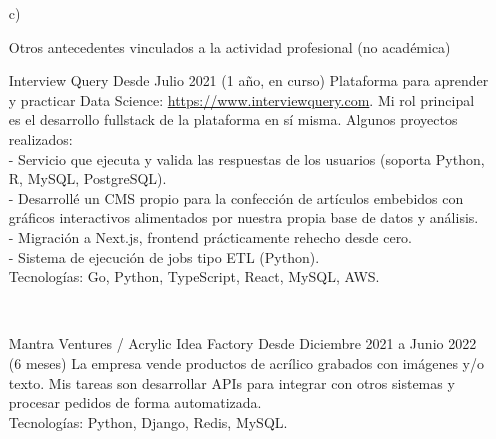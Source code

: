 \begin{enumerate}[leftmargin=0.8cm]

  \item[c)]{Otros antecedentes vinculados a la actividad profesional (no académica)

    \begin{itemize}[leftmargin=0.2cm]

      {Interview Query}
      {Desde Julio 2021 (1 año, en curso)}
      {
        Plataforma para aprender y practicar Data Science: \url{https://www.interviewquery.com}. Mi rol principal es el desarrollo fullstack de la plataforma en sí misma. Algunos proyectos realizados:
        \\ - Servicio que ejecuta y valida las respuestas de los usuarios (soporta Python, R, MySQL, PostgreSQL).
        \\ - Desarrollé un CMS propio para la confección de artículos embebidos con gráficos interactivos alimentados por nuestra propia base de datos y análisis.
        \\ - Migración a Next.js, frontend prácticamente rehecho desde cero.
        \\ - Sistema de ejecución de jobs tipo ETL (Python).
        \\ Tecnologías: Go, Python, TypeScript, React, MySQL, AWS.
      }

      ~

      {Mantra Ventures / Acrylic Idea Factory}
      {Desde Diciembre 2021 a Junio 2022 (6 meses)}
      {
        La empresa vende productos de acrílico grabados con imágenes y/o texto. Mis tareas son desarrollar APIs para integrar con otros sistemas y procesar pedidos de forma automatizada.
        \\ Tecnologías: Python, Django, Redis, MySQL.
      }

      ~


\end{itemize}}
\end{enumerate}
